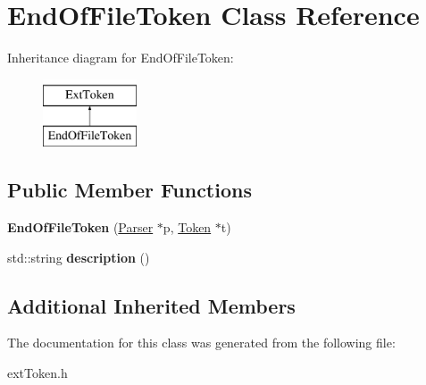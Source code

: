 \hypertarget{classEndOfFileToken}{\section{End\-Of\-File\-Token Class Reference}
\label{classEndOfFileToken}
}
Inheritance diagram for End\-Of\-File\-Token\-:\begin{figure}[H]
\begin{center}
\leavevmode
\includegraphics[height=2.000000cm]{classEndOfFileToken}
\end{center}
\end{figure}
\subsection*{Public Member Functions}
\begin{DoxyCompactItemize}
\item 
\hypertarget{classEndOfFileToken_a5c093bc13648a4f4df525ea4242e59d9}{{\bfseries End\-Of\-File\-Token} (\hyperlink{classParser}{Parser} $\ast$p, \hyperlink{classToken}{Token} $\ast$t)}\label{classEndOfFileToken_a5c093bc13648a4f4df525ea4242e59d9}

\item 
\hypertarget{classEndOfFileToken_a918312b101ca8cc7fb5ba4e56bc12b58}{std\-::string {\bfseries description} ()}\label{classEndOfFileToken_a918312b101ca8cc7fb5ba4e56bc12b58}

\end{DoxyCompactItemize}
\subsection*{Additional Inherited Members}


The documentation for this class was generated from the following file\-:\begin{DoxyCompactItemize}
\item 
ext\-Token.\-h\end{DoxyCompactItemize}
